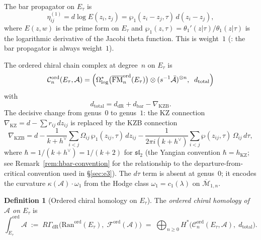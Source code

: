\documentclass[11pt,reqno]{amsart}
\theoremstyle{definition}
\newtheorem{definition}[theorem]{Definition}
\theoremstyle{remark}
\newcommand{\cA}{\mathcal{A}}
\newcommand{\cC}{\mathcal{C}}
\newcommand{\cF}{\mathcal{F}}
\newcommand{\cM}{\mathcal{M}}
\newcommand{\Ran}{\mathrm{Ran}}
\DeclareMathOperator{\FM}{FM}
\numberwithin{equation}{section}
\begin{document}
The bar propagator on $E_\tau$ is
\begin{equation}\label{eq:bar-prop-ell}
  \eta^{(1)}_{ij}
  = d\log E(z_i, z_j)
  = \wp_1(z_i - z_j, \tau)\,d(z_i - z_j),
\end{equation}
where $E(z,w)$ is the prime form on $E_\tau$ and
$\wp_1(z, \tau) = \theta_1'(z|\tau)/\theta_1(z|\tau)$
is the logarithmic derivative of the Jacobi theta function. This is weight~$1$ (: the bar propagator
is always weight~$1$).

The ordered chiral chain complex at degree~$n$ on $E_\tau$
is
\begin{equation}\label{eq:ell-chiral-cx}
  \cC_n^{\mathrm{ord}}(E_\tau, \cA)
  = \Bigl(
  \Omega^*_{\log}\bigl(
  \overline{\FM}_n^{\mathrm{ord}}(E_\tau)\bigr)
  \otimes (s^{-1}\bar{\cA})^{\otimes n},
  \;\; d_{\mathrm{total}}
  \Bigr)
\end{equation}
with
\begin{equation}\label{eq:d-total-ell}
  d_{\mathrm{total}}
  = d_{\mathrm{dR}}
  + d_{\mathrm{bar}}
  - \nabla_{\mathrm{KZB}}.
\end{equation}
The decisive change from genus~$0$ to genus~$1$: the
KZ connection $\nabla_{\mathrm{KZ}} = d - \sum r_{ij}\,dz_{ij}$
is replaced by the KZB connection
\begin{equation}\label{eq:kzb-ell}
  \nabla_{\mathrm{KZB}}
  = d
  - \frac{1}{k + h^\vee}
  \sum_{i < j} \Omega_{ij}\,
  \wp_1(z_{ij}, \tau)\,dz_{ij}
  - \frac{1}{2\pi i(k + h^\vee)}
  \sum_{i < j} \wp(z_{ij}, \tau)\,\Omega_{ij}\,d\tau,
\end{equation}
where $\hbar = 1/(k + h^\vee) = 1/(k+2)$ for
$\mathfrak{sl}_2$
\textup{(}the Yangian convention
$\hbar = h_{\mathrm{KZ}}$; see
Remark~\textup{\ref{rem:hbar-convention}} for the
relationship to the departure-from-critical convention
used in \S\textup{\ref{sec:e3}}\textup{)}.
The $d\tau$ term is absent at genus~$0$; it encodes the
curvature $\kappa(\cA) \cdot \omega_1$ from the Hodge class
$\omega_1 = c_1(\lambda)$ on $\overline{\cM}_{1,n}$.

\begin{definition}[Ordered chiral homology on $E_\tau$]
\label{def:ord-ch-ell}
The \emph{ordered chiral homology of $\cA$ on $E_\tau$} is
\begin{equation}\label{eq:ord-ch-ell}
  \int_{E_\tau}^{\mathrm{ord}} \cA
  \;:=\;
  R\Gamma_{\mathrm{dR}}\bigl(
  \Ran^{\mathrm{ord}}(E_\tau),\;
  \cF^{\mathrm{ord}}(\cA)\bigr)
  \;=\;
  \bigoplus_{n \geq 0}
  H^*\bigl(
  \cC_n^{\mathrm{ord}}(E_\tau, \cA),\;
  d_{\mathrm{total}}\bigr).
\end{equation}
\end{definition}
\end{document}
